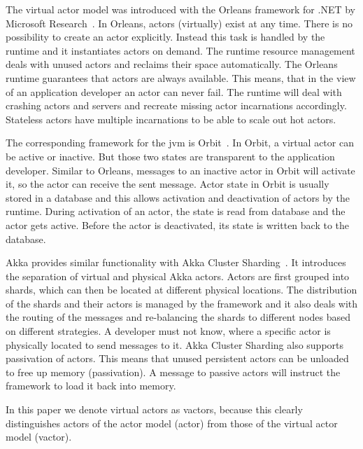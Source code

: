   The virtual actor model was introduced with the Orleans framework for .NET by Microsoft Research~\cite{bernstein:orleans}.
  In Orleans, actors (virtually) exist at any time.
  There is no possibility to create an actor explicitly.
  Instead this task is handled by the runtime and it instantiates actors on demand.
  The runtime resource management deals with unused actors and reclaims their space automatically.
  The Orleans runtime guarantees that actors are always available.
  This means, that in the view of an application developer an actor can never fail.
  The runtime will deal with crashing actors and servers and recreate missing actor incarnations accordingly.
  Stateless actors have multiple incarnations to be able to scale out hot actors.

  The corresponding framework for the \gls{jvm} is Orbit~\cite{orbit}.
  In Orbit, a virtual actor can be active or inactive.
  But those two states are transparent to the application developer.
  Similar to Orleans, messages to an inactive actor in Orbit will activate it, so the actor can receive the sent message.
  Actor state in Orbit is usually stored in a database and this allows activation and deactivation of actors by the runtime.
  During activation of an actor, the state is read from database and the actor gets active.
  Before the actor is deactivated, its state is written back to the database.

  Akka provides similar functionality with Akka Cluster Sharding~\cite{akka:clustersharding}.
  It introduces the separation of virtual and physical Akka actors.
  Actors are first grouped into shards, which can then be located at different physical locations.
  The distribution of the shards and their actors is managed by the framework and it also deals with the routing of the messages and re-balancing the shards to different nodes based on different strategies.
  A developer must not know, where a specific actor is physically located to send messages to it.
  Akka Cluster Sharding also supports passivation of actors.
  This means that unused persistent actors can be unloaded to free up memory (passivation).
  A message to passive actors will instruct the framework to load it back into memory.

  In this paper we denote virtual actors as vactors, because this clearly distinguishes actors of the actor model (actor) from those of the virtual actor model (vactor).


